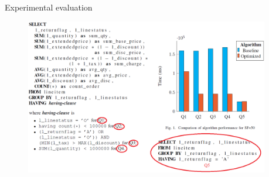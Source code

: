 \documentclass[compress, dvipsnames, unicode]{beamer}
\begin{document}
\begin{frame}{Experimental evaluation}
\begin{figure}
	\centering
	\includegraphics[width=0.95\textwidth]{./aggr-results}
\end{figure}
\end{frame}
\end{document}
